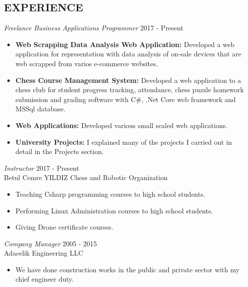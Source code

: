\documentclass[line,margin]{res}
\begin{document}
\begin{resume}
\begin{itemize}
\section{EXPERIENCE} {\sl Freelance Business Applications Programmer} \hfill  2017 - Present \\
                 \begin{itemize}  \itemsep -2pt %
                 \item \textbf{Web Scrapping Data Analysis Web Application: } Developed a web application for representation with data analysis of on-sale devices that are web scrapped from varios e-commerce websites. 
                 \item \textbf{Chess Course Management System: } Developed a web application to a chess club for student progress tracking, attendance, chess puzzle homework submission and grading software with C\#, .Net Core web framework and MSSql database. 
                \item \textbf{Web Applications: } Developed various small scaled web applications.
                \item \textbf{University Projects: } I explained many of the projects I carried out in detail in the Projects section.
                \end{itemize}
 
                {\sl  Instructor} \hfill             2017 - Present \\
                Betul Cemre YILDIZ Chess and Robotic Organization
                 \begin{itemize}  \itemsep -2pt %
                 \item Teaching Csharp programming courses to high school students.
                 \item Performing  Linux Administration courses to high school students.
                 \item Giving Drone certificate courses.
                 \end{itemize} 

                 
                {\sl Company Manager} \hfill        2005 - 2015 \\
                Adacelik Engineering LLC
                  \begin{itemize}
                   \item We have done construction works in the public and private sector with my chief engineer duty.
                     

\end{itemize}
\end{itemize}
\end{resume}
\end{document}
